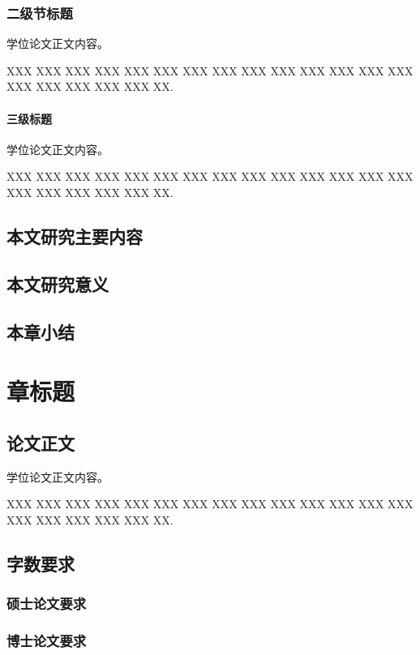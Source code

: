 \documentclass{westlakethesis}
\begin{document}
\subsection{二级节标题}

学位论文正文内容。

XXX XXX XXX XXX XXX XXX XXX XXX XXX XXX XXX XXX XXX XXX XXX
XXX XXX XXX XXX XX.

\subsubsection{三级标题}

学位论文正文内容。

XXX XXX XXX XXX XXX XXX XXX XXX XXX XXX XXX XXX XXX XXX XXX
XXX XXX XXX XXX XX.

\section{本文研究主要内容}

\section{本文研究意义}

\section{本章小结}

\chapter{章标题}

\section{论文正文}

学位论文正文内容。

XXX XXX XXX XXX XXX XXX XXX XXX XXX XXX XXX XXX XXX XXX XXX
XXX XXX XXX XXX XX.

\section{字数要求}

\subsection{硕士论文要求}

\subsection{博士论文要求}
\end{document}
